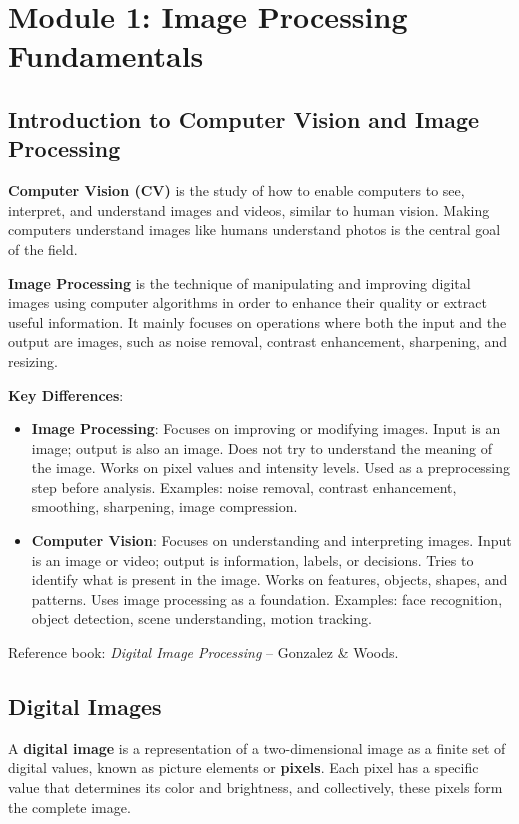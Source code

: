\documentclass[11pt,a4paper]{article}
\begin{document}
\tableofcontents
\newpage

\section{Module 1: Image Processing Fundamentals}

\subsection{Introduction to Computer Vision and Image Processing}

\textbf{Computer Vision (CV)} is the study of how to enable computers to see, interpret, and understand images and videos, similar to human vision. Making computers understand images like humans understand photos is the central goal of the field.

\textbf{Image Processing} is the technique of manipulating and improving digital images using computer algorithms in order to enhance their quality or extract useful information. It mainly focuses on operations where both the input and the output are images, such as noise removal, contrast enhancement, sharpening, and resizing.

\textbf{Key Differences}:
\begin{itemize}
    \item \textbf{Image Processing}: Focuses on improving or modifying images. Input is an image; output is also an image. Does not try to understand the meaning of the image. Works on pixel values and intensity levels. Used as a preprocessing step before analysis. Examples: noise removal, contrast enhancement, smoothing, sharpening, image compression.
    \item \textbf{Computer Vision}: Focuses on understanding and interpreting images. Input is an image or video; output is information, labels, or decisions. Tries to identify what is present in the image. Works on features, objects, shapes, and patterns. Uses image processing as a foundation. Examples: face recognition, object detection, scene understanding, motion tracking.
\end{itemize}

Reference book: \textit{Digital Image Processing} -- Gonzalez \& Woods.

\subsection{Digital Images}

A \textbf{digital image} is a representation of a two-dimensional image as a finite set of digital values, known as picture elements or \textbf{pixels}. Each pixel has a specific value that determines its color and brightness, and collectively, these pixels form the complete image.
\end{document}
